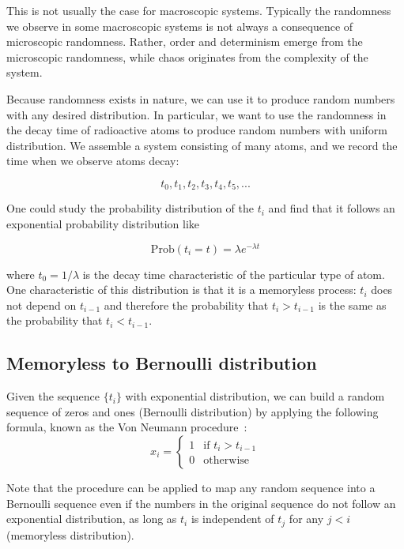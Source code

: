 \documentclass[justified, sixbynine]{tufte-book}
\theoremstyle{plain}%
\newtheorem * {corollary}{Corollary}
\theoremstyle{definition}
\theoremstyle{remark}
\newtheorem * {remark}{Remark}
\newtheorem * {note}{Note}
\begin{document}
\begin{fullwidth}
This is not usually the case for macroscopic systems. Typically the
randomness we observe in some macroscopic systems is not always a
consequence of microscopic randomness. Rather, order and determinism
emerge from the microscopic randomness, while chaos originates from the complexity of
the system.

Because randomness exists in nature, we can use it to produce random numbers
with any desired distribution. In particular, we want to use the randomness
in the decay time of radioactive atoms to produce random numbers with
uniform distribution. We assemble a system consisting of many
atoms, and we record the time when we observe atoms decay:

\begin{equation}
t_0, t_1, t_2, t_3, t_4, t_5, ...
\end{equation}

One could study the probability distribution of the $t_i$ and find
that it follows an exponential probability distribution like

\begin{equation}
\textrm{Prob}(t_i = t)=\lambda e^{-\lambda t}
\end{equation}

where $t_0=1/\lambda $ is the decay time characteristic of the particular
type of atom. One characteristic of this distribution is that it is a memoryless process: $t_i$ does not depend on $t_{i-1}$ and therefore the probability that $t_i>t_{i-1}$ is the same as the probability that $t_i<t_{i-1}$.

\goodbreak\subsection{Memoryless to Bernoulli distribution}


Given the sequence $\{t_i\}$ with exponential distribution, we can build a
random sequence of zeros and ones (Bernoulli distribution) by applying the following formula, known as the Von Neumann procedure~\cite{bits}:
\begin{equation}
x_i=\left\{
\begin{array}{ll}
1 & \text{if }t_{i}>t_{i-1} \\
0 & \text{otherwise}
\end{array}
\right.
\end{equation}

Note that the procedure can be applied to map any random sequence into
a Bernoulli sequence even if the numbers in the original sequence do not
follow an exponential distribution, as long as $t_i$ is independent of $t_j$
for any $j<i$ (memoryless distribution).


\end{fullwidth}
\end{document}

